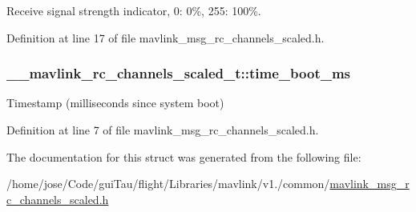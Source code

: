 Receive signal strength indicator, 0\-: 0\%, 255\-: 100\%. 



Definition at line 17 of file mavlink\-\_\-msg\-\_\-rc\-\_\-channels\-\_\-scaled.\-h.

\hypertarget{struct____mavlink__rc__channels__scaled__t_ae035a89efbc6107932416a1a65268bfe}{
\subsubsection[{time\-\_\-boot\-\_\-ms}]{ \-\_\-\-\_\-mavlink\-\_\-rc\-\_\-channels\-\_\-scaled\-\_\-t\-::time\-\_\-boot\-\_\-ms}}\label{struct____mavlink__rc__channels__scaled__t_ae035a89efbc6107932416a1a65268bfe}


Timestamp (milliseconds since system boot) 



Definition at line 7 of file mavlink\-\_\-msg\-\_\-rc\-\_\-channels\-\_\-scaled.\-h.



The documentation for this struct was generated from the following file\-:\begin{DoxyCompactItemize}
\item 
/home/jose/\-Code/gui\-Tau/flight/\-Libraries/mavlink/v1./common/\hyperlink{mavlink__msg__rc__channels__scaled_8h}{mavlink\-\_\-msg\-\_\-rc\-\_\-channels\-\_\-scaled.\-h}\end{DoxyCompactItemize}
